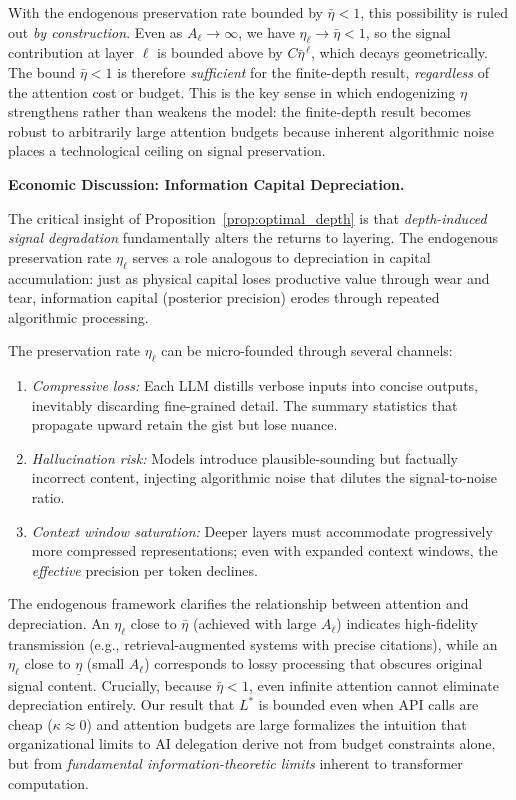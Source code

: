 With the endogenous preservation rate bounded by $\bar{\eta} < 1$, this possibility is ruled out \emph{by construction}. Even as $A_\ell \to \infty$, we have $\eta_\ell \to \bar{\eta} < 1$, so the signal contribution at layer $\ell$ is bounded above by $C\bar{\eta}^{\,\ell}$, which decays geometrically. The bound $\bar{\eta} < 1$ is therefore \emph{sufficient} for the finite-depth result, \emph{regardless} of the attention cost or budget. This is the key sense in which endogenizing $\eta$ strengthens rather than weakens the model: the finite-depth result becomes robust to arbitrarily large attention budgets because inherent algorithmic noise places a technological ceiling on signal preservation.

\vspace{1em}
\noindent\textbf{Economic Discussion: Information Capital Depreciation.}

The critical insight of Proposition~\ref{prop:optimal_depth} is that \emph{depth-induced signal degradation} fundamentally alters the returns to layering. The endogenous preservation rate $\eta_\ell$ serves a role analogous to depreciation in capital accumulation: just as physical capital loses productive value through wear and tear, information capital (posterior precision) erodes through repeated algorithmic processing.

The preservation rate $\eta_\ell$ can be micro-founded through several channels:
\begin{enumerate}[label=(\roman*)]
\item \emph{Compressive loss:} Each LLM distills verbose inputs into concise outputs, inevitably discarding fine-grained detail. The summary statistics that propagate upward retain the gist but lose nuance.
\item \emph{Hallucination risk:} Models introduce plausible-sounding but factually incorrect content, injecting algorithmic noise that dilutes the signal-to-noise ratio.
\item \emph{Context window saturation:} Deeper layers must accommodate progressively more compressed representations; even with expanded context windows, the \emph{effective} precision per token declines.
\end{enumerate}

The endogenous framework clarifies the relationship between attention and depreciation. An $\eta_\ell$ close to $\bar{\eta}$ (achieved with large $A_\ell$) indicates high-fidelity transmission (e.g., retrieval-augmented systems with precise citations), while an $\eta_\ell$ close to $\underline{\eta}$ (small $A_\ell$) corresponds to lossy processing that obscures original signal content. Crucially, because $\bar{\eta} < 1$, even infinite attention cannot eliminate depreciation entirely. Our result that $L^{*}$ is bounded even when API calls are cheap ($\kappa \approx 0$) and attention budgets are large formalizes the intuition that organizational limits to AI delegation derive not from budget constraints alone, but from \emph{fundamental information-theoretic limits} inherent to transformer computation.

